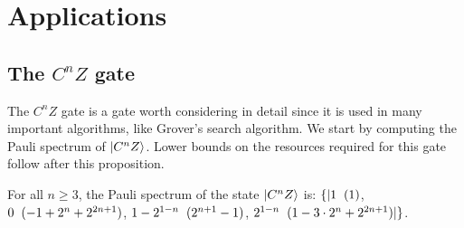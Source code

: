 \documentclass[12pt]{dalthesis}
\begin{document}
\chapter{Applications}
\label{Applications}

\section{The \texorpdfstring{$C^nZ$}{CnZ} gate}

The $C^n Z$ gate is a gate worth considering in detail since it is used in many important algorithms, like Grover's search algorithm. We start by computing the Pauli spectrum of $\ket{C^nZ}$. Lower bounds on the resources required for this gate follow after this proposition.

\begin{proposition}
\label{prop4.2}
For all $n \geq 3$, the Pauli spectrum of the state $\ket{C^n Z}$ is: $\{ | 1 \hspace{2mm} (1)$, $0 \hspace{2mm} (-1 +2^{n} + 2^{2n+1})$, $1-2^{1-n} \hspace{2mm} (2^{n+1} -1)$, $2^{1-n}  \hspace{2mm} (1-3 \cdot 2^{n} + 2^{2n+1}) | \}$.
\end{proposition}
\end{document}
